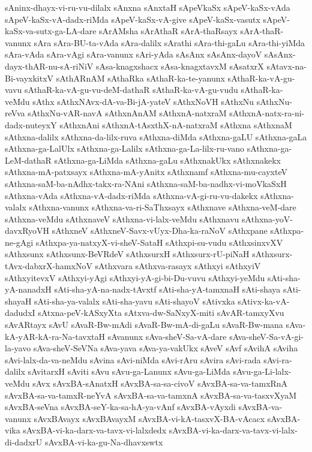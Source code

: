 {sAninx-dhayx-vi-ru-vu-dilalx
sAnxna
sAnxtaH
sApeVkaSx
sApeV-kaSx-vAda
sApeV-kaSx-vA-dadx-riMda
sApeV-kaSx-vA-give
sApeV-kaSx-vasutx
sApeV-kaSx-va-sutx-ga-LA-dare
sArAMsha
sArAthaR
sArA-thaRsayx
sArA-thaR-vanunx
sAra
sAra-BU-ta-vAda
sAra-dalilx
sArathi
sAra-thi-gaLu
sAra-thi-yiMda
sAra-vAda
sAra-vAgi
sAra-vanunx
sAri-yAda
sAsAnx
sAsAnx-dayoV
sAsAnx-dayx-thAR-nu-sA-riNiV
sAsa-knagxshacx
sAsa-knagxtavxM
sAsatxrX
sAtavx-na-Bi-vayxkitxV
sAthARnAM
sAthaRka
sAthaR-ka-te-yanunx
sAthaR-ka-vA-gu-vavu
sAthaR-ka-vA-gu-vu-deM-dathaR
sAthaR-ka-vA-gu-vudu
sAthaR-ka-veMdu
sAthx
sAthxNAvx-dA-va-Bi-jA-yateV
sAthxNoVH
sAthxNu
sAthxNu-reVva
sAthxNu-vAR-navA
sAthxnAnAM
sAthxnA-natxraM
sAthxnA-natx-ra-ni-dadx-nuteyxY
sAthxnAni
sAthxnA-tAsxthX-nA-natxraM
sAthxna
sAthxnaM
sAthxna-dalilx
sAthxna-da-lilx-ruva
sAthxna-diMda
sAthxna-gaLU
sAthxna-gaLa
sAthxna-ga-LalUlx
sAthxna-ga-Lalilx
sAthxna-ga-La-lilx-ru-vano
sAthxna-ga-LeM-dathaR
sAthxna-ga-LiMda
sAthxna-gaLu
sAthxnakUkx
sAthxnakekx
sAthxna-mA-patxsayx
sAthxna-mA-yAnitx
sAthxnamf
sAthxna-mu-cayxteV
sAthxna-saM-ba-nAdhx-takx-ra-NAni
sAthxna-saM-ba-nadhx-vi-moVkaSxH
sAthxna-vAda
sAthxna-vA-dadx-riMda
sAthxna-vA-gi-ru-vu-dakekx
sAthxna-valalx
sAthxna-vanunx
sAthxna-va-ri-SaThxsayx
sAthxnave
sAthxna-veM-dare
sAthxna-veMdu
sAthxnaveV
sAthxna-vi-lalx-veMdu
sAthxnavu
sAthxna-yoV-davxRyoVH
sAthxneV
sAthxneV-Savx-vUyx-Dha-ka-raNoV
sAthxpane
sAthxpa-ne-gAgi
sAthxpa-ya-natxyX-vi-sheV-SataH
sAthxpi-su-vudu
sAthxsinxvXV
sAthxsunx
sAthxsunx-BeVRdeV
sAthxsurxH
sAthxsurx-rU-piNaH
sAthxsurx-tAvx-dabxrX-hamxNoV
sAthxvara
sAthxva-rasayx
sAthxyi
sAthxyiV
sAthxyitevxV
sAthxyi-yAgi
sAthxyi-yA-gi-bi-Du-vuvu
sAthxyi-yeMdu
sAti-sha-yA-nanadxH
sAti-sha-yA-na-nadx-tAvxtf
sAti-sha-yA-tamxnaH
sAti-shaya
sAti-shayaH
sAti-sha-ya-valalx
sAti-sha-yavu
sAti-shayoV
sAtivxka
sAtivx-ka-vA-dadudxI
sAtxna-peV-kASxyXta
sAtxva-dw-SaNxyX-miti
sAvAR-tamxyXvu
sAvARtayx
sAvU
sAvaR-Bw-mAdi
sAvaR-Bw-mA-di-gaLu
sAvaR-Bw-mana
sAva-kA-yAR-kA-ra-Na-tavxtaH
sAvanunx
sAva-sheV-Sa-vA-dare
sAva-sheV-Sa-vA-gi-la-yavo
sAva-sheV-SeVNa
sAva-yava
sAva-ya-vakUkx
sAveV
sAvf
sAvihA
sAviha
sAvi-lalx-da-va-neMdu
sAvina
sAvi-niMda
sAvi-rAru
sAvira
sAvi-rada
sAvi-ra-dalilx
sAvitarxH
sAviti
sAvu
sAvu-ga-Lanunx
sAvu-ga-LiMda
sAvu-ga-Li-lalx-veMdu
sAvx
sAvxBA-sAnatxH
sAvxBA-sa-sa-civoV
sAvxBA-sa-va-tamxRnA
sAvxBA-sa-va-tamxR-neYvA
sAvxBA-sa-va-tamxnA
sAvxBA-sa-va-tasxvXyaM
sAvxBA-seVna
sAvxBA-seY-ka-sa-hA-ya-vAnf
sAvxBA-vAyxdi
sAvxBA-va-vanunx
sAvxBAvayx
sAvxBAvayxM
sAvxBA-vi-kA-tasxvX-BA-vAcacx
sAvxBA-vika
sAvxBA-vi-ka-darx-va-tavx-vi-lalxdedx
sAvxBA-vi-ka-darx-va-tavx-vi-lalx-di-dadxrU
sAvxBA-vi-ka-gu-Na-dhavxswtx
}

